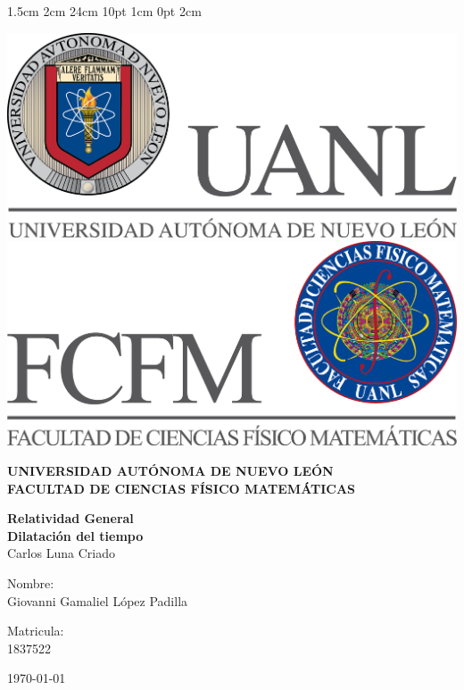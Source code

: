 \documentclass[12pt,letterpaper]{report}
\begin{document}
\setmargins{2.5cm}      
{1.5cm}                     
{2cm}  
{24cm}                    
{10pt}                          
{1cm}                          
{0pt}                             
{2cm}
\begin{titlepage}
\begin{center}
\includegraphics[scale=0.40]{../../Logos/uanl.png} 
\hspace{2.5cm}
\includegraphics[scale=0.40]{../../Logos/fcfm.png}
\end{center}
\vspace{2cm}
\begin{center}
\textbf{
UNIVERSIDAD AUTÓNOMA DE NUEVO LEÓN\\
FACULTAD DE CIENCIAS
    FÍSICO MATEMÁTICAS}\\
\vspace*{2cm}
\begin{large}
\vspace{1cm}
\large{\textbf{Relatividad General}}\\
\textbf{Dilatación del tiempo}\\
Carlos Luna Criado\\
\end{large}
\vspace{3.5cm}
\begin{minipage}{0.6\linewidth}
\vspace{0.5cm}
\changefontsizes{14pt}
Nombre:\\
Giovanni Gamaliel López Padilla\\
\end{minipage}
\begin{minipage}{0.2\linewidth}
\changefontsizes{14pt}
Matricula:\\
1837522
\end{minipage}
\end{center}
\vspace{4cm}
\begin{flushright}
\today
\end{flushright}
\end{titlepage}
\end{document}
